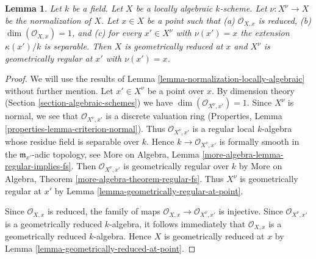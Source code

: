 \documentclass[10pt,a4paper]{amsart}
\theoremstyle{plain}
\newtheorem{lemma}[subsection]{Lemma}
\theoremstyle{definition}
\theoremstyle{remark}
\numberwithin{equation}{subsection}
\begin{document}
\begin{lemma}
\label{lemma-geometrically-normal-in-codim-1}
Let $k$ be a field. Let $X$ be a locally algebraic $k$-scheme.
Let $\nu : X^\nu \to X$ be the normalization of $X$.
Let $x \in X$ be a point such that (a) $\mathcal{O}_{X, x}$
is reduced, (b) $\dim(\mathcal{O}_{X, x}) = 1$, and (c)
for every $x' \in X^\nu$ with $\nu(x') = x$ the extension
$\kappa(x')/k$ is separable. Then $X$ is geometrically reduced at $x$
and $X^\nu$ is geometrically regular at $x'$ with $\nu(x') = x$.
\end{lemma}

\begin{proof}
We will use the results of Lemma \ref{lemma-normalization-locally-algebraic}
without further mention. Let $x' \in X^\nu$ be a point over $x$.
By dimension theory (Section \ref{section-algebraic-schemes}) we have
$\dim(\mathcal{O}_{X^\nu, x'}) = 1$. Since $X^\nu$ is normal, we
see that $\mathcal{O}_{X^\nu, x'}$ is a discrete valuation ring
(Properties, Lemma \ref{properties-lemma-criterion-normal}).
Thus $\mathcal{O}_{X^\nu, x'}$ is a regular local $k$-algebra
whose residue field is separable over $k$. Hence
$k \to \mathcal{O}_{X^\nu, x'}$ is formally smooth
in the $\mathfrak m_{x'}$-adic topology, see
More on Algebra, Lemma \ref{more-algebra-lemma-regular-implies-fs}.
Then $\mathcal{O}_{X^\nu, x'}$ is geometrically regular
over $k$ by
More on Algebra, Theorem \ref{more-algebra-theorem-regular-fs}.
Thus $X^\nu$ is geometrically regular at $x'$ by
Lemma \ref{lemma-geometrically-regular-at-point}.

\medskip\noindent
Since $\mathcal{O}_{X, x}$ is reduced, the family of maps
$\mathcal{O}_{X, x} \to \mathcal{O}_{X^\nu, x'}$ is injective.
Since $\mathcal{O}_{X^\nu, x'}$ is a geometrically reduced
$k$-algebra, it follows immediately that $\mathcal{O}_{X, x}$
is a geometrically reduced $k$-algebra. Hence $X$ is geometrically
reduced at $x$ by Lemma \ref{lemma-geometrically-reduced-at-point}.
\end{proof}
\end{document}

